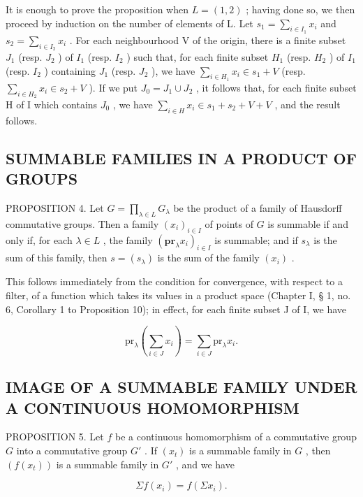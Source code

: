It is enough to prove the proposition when \(L = (1,2)\) ; having done so, we then proceed by induction on the number of elements of L. Let \(s_{1} = \sum_{i \in I_{1}} x_{i}\) and \(s_{2} = \sum_{i \in I_{2}} x_{i}\) . For each neighbourhood V of the origin, there is a finite subset \(J_{1}\) (resp. \(J_{2}\) ) of \(I_{1}\) (resp. \(I_{2}\) ) such that, for each finite subset \(H_{1}\) (resp. \(H_{2}\) ) of \(I_{1}\) (resp. \(I_{2}\) ) containing \(J_{1}\) (resp. \(J_{2}\) ), we have \(\sum_{i \in H_{1}} x_{i} \in s_{1} + V\) (resp. \(\sum_{i \in H_{2}} x_{i} \in s_{2} + V\) ). If we put \(J_{0} = J_{1} \cup J_{2}\) , it follows that, for each finite subset H of I which contains \(J_{0}\) , we have \(\sum_{i \in H} x_{i} \in s_{1} + s_{2} + V + V\) , and the result follows.

\subsection{SUMMABLE FAMILIES IN A PRODUCT OF GROUPS}

PROPOSITION 4. Let \(G = \prod_{\lambda \in L} G_{\lambda}\) be the product of a family of Hausdorff commutative groups. Then a family \((x_{i})_{i \in I}\) of points of \(G\) is summable if and only if, for each \(\lambda \in L\) , the family \((\mathbf{pr}_{\lambda} x_{i})_{i \in I}\) is summable; and if \(s_{\lambda}\) is the sum of this family, then \(s = (s_{\lambda})\) is the sum of the family \((x_{i})\) .

This follows immediately from the condition for convergence, with respect to a filter, of a function which takes its values in a product space (Chapter I, § 1, no. 6, Corollary 1 to Proposition 10); in effect, for each finite subset J of I, we have

\[
\mathrm{pr} _ {\lambda} \left(\sum_ {i \in J} x _ {i}\right) = \sum_ {i \in J} \mathrm{pr} _ {\lambda} x _ {i}.
\]

\subsection{IMAGE OF A SUMMABLE FAMILY UNDER A CONTINUOUS HOMOMORPHISM}

PROPOSITION 5. Let \(f\) be a continuous homomorphism of a commutative group \(G\) into a commutative group \(G'\) . If \((x_t)\) is a summable family in \(G\) , then \((f(x_t))\) is a summable family in \(G'\) , and we have

\[
\Sigma f (x _ {i}) = f (\Sigma x _ {i}).\tag{3}
\]

